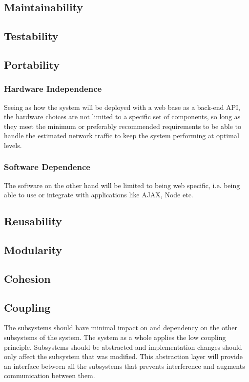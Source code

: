 \documentclass[11pt]{article}
\begin{document}
	\subsection{Maintainability}
	\subsection{Testability}
	\subsection{Portability}
	\subsubsection{Hardware Independence}
	Seeing as how the system will be deployed with a web base as a back-end API, the hardware choices are not limited to a specific set of components, so long as they meet the minimum or preferably recommended requirements to be able to handle the estimated network traffic to keep the system performing at optimal levels.
	\subsubsection{Software Dependence}
	The software on the other hand will be limited to being web specific, i.e. being able to use or integrate with applications like AJAX, Node etc.
	\subsection{Reusability}
	\subsection{Modularity}
	\subsection{Cohesion}
	\subsection{Coupling}
	The subsystems should have minimal impact on and dependency on the other subsystems of the system. The system as a whole applies the low coupling principle. Subsystems should be abstracted and implementation changes should only affect the subsystem that was modified. This abstraction layer will provide an interface between all the subsystems that prevents interference and augments communication between them.
	
\end{document}
